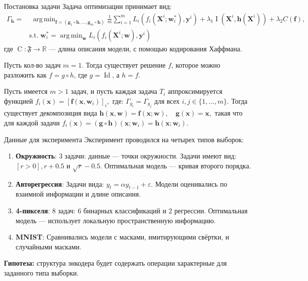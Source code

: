 \documentclass{beamer}
\DeclareMathOperator*{\argmin}{arg\,min}
\begin{document}
\begin{frame}{Постановка задачи}
Задача оптимизации принимает вид: \vspace{-5}
\begin{align*}
    \Gamma_{\mathbf{h}} = &\; \argmin_{\mathbf{f} = (\mathbf{g}_1 \circ \mathbf{h}, \dots, \mathbf{g}_m \circ \mathbf{h})} 
    \frac{1}{m} \sum_{i=1}^m L_i(f_i(\mathbf{X}^i; \mathbf{w}^*_i), \mathbf{y}^i) + \lambda_1\operatorname{I}(\mathbf{X}^i, \mathbf{h}(\mathbf{X}^i))+ \lambda_2C(\mathbf{f}),\\ 
    & \text{s.t.} \; 
    \mathbf{w}^*_i = \argmin_{\mathbf{w}} L_i(f_i(\mathbf{X}^i; \mathbf{w}), \mathbf{y}^i)
\end{align*}
{\small где \(\operatorname{C}: \mathfrak{F} \rightarrow \mathbb{R}\) --- длина описания модели, с помощью кодирования Хаффмана.}
\begin{theorem}[Набиев, 2025]
Пусть кол-во задач $m=1$. Тогда существует решение $f$, которое можно разложить как $f = g \circ h$, где $g = \operatorname{Id}$, а $h = f$.
\end{theorem} \vspace{-5}
\begin{corollary}
Пусть имеется $m > 1$ задач, и пусть каждая задача $T_i$ аппроксимируется функцией $ f_i(\mathbf{x}) = \left[ \mathbf{f}(\mathbf{x}, \mathbf{w}_i) \right]_i, $ где: $\Gamma_{g_i} = \Gamma_{g_j}$ для всех $i, j \in \{1, \dots, m\}$. Тогда существует декомпозиция вида $ \mathbf{h}(\mathbf{x}, \mathbf{w}) = \mathbf{f}(\mathbf{x}; \mathbf{w}), \quad \mathbf{g}(\mathbf{x}) = \mathbf{x},$ такая что для каждой задачи $ f_i(\mathbf{x}) = (\mathbf{g} \circ \mathbf{h})(\mathbf{x}; \mathbf{w}_i) = \mathbf{h}(\mathbf{x}; \mathbf{w}_i)$.
\end{corollary}

\end{frame}
\begin{frame}{Данные для эксперимента}
Эксперимент проводился на четырех типов выборок:
\begin{enumerate}
    \item \textbf{Окружность}: 3 задачи: данные --- точки окружности. Задачи имеют вид: \([r > 0], r + 0.5\) и \(\sqrt{r} - 0.5\). Оптимальная модель --- кривая второго порядка.
    \item \textbf{Авторегрессия}: Задачи вида: \(y_t = \alpha y_{t-1} + \varepsilon\). Модели оценивались по взаимной информации и длине описания.
    \item \textbf{4-пикселя}: 8 задач: 6 бинарных классификаций и 2 регрессии. Оптимальная модель --- использует локальную пространственную информацию.
    \item \textbf{MNIST}: Сравнивались модели с масками, имитирующими свёртки, и случайными масками.
\end{enumerate}
\textbf{Гипотеза:} структура энкодера будет содержать операции характерные для заданного типа выборки.
\end{frame}
\end{document}
